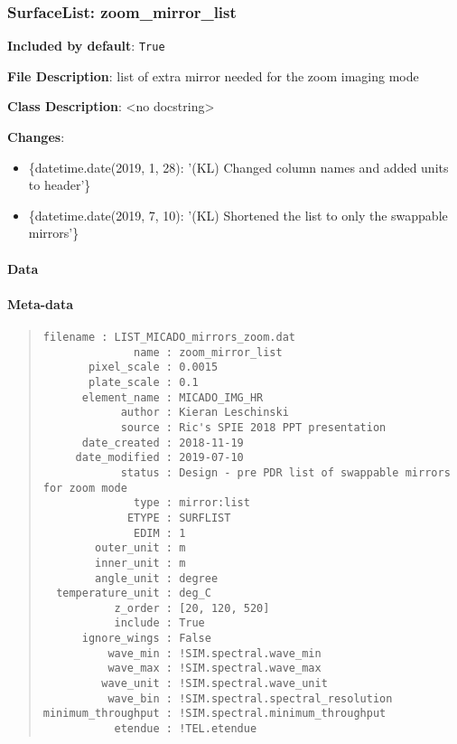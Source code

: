 \subsubsection{SurfaceList: \textquotedbl{}zoom\_mirror\_list\textquotedbl{}%
  \label{surfacelist-zoom-mirror-list}%
}

\textbf{Included by default}: \texttt{True}

\textbf{File Description}: list of extra mirror needed for the zoom imaging mode

\textbf{Class Description}: <no docstring>

\textbf{Changes}:

\begin{itemize}
\item \{datetime.date(2019, 1, 28): '(KL) Changed column names and added units to header'\}

\item \{datetime.date(2019, 7, 10): '(KL) Shortened the list to only the swappable mirrors'\}
\end{itemize}


\paragraph{Data%
  \label{data}%
}


\paragraph{Meta-data%
  \label{meta-data}%
}

\begin{quote}
\begin{alltt}
\begin{lstlisting}[frame=single]
          filename : LIST_MICADO_mirrors_zoom.dat
              name : zoom_mirror_list
       pixel_scale : 0.0015
       plate_scale : 0.1
      element_name : MICADO_IMG_HR
            author : Kieran Leschinski
            source : Ric's SPIE 2018 PPT presentation
      date_created : 2018-11-19
     date_modified : 2019-07-10
            status : Design - pre PDR list of swappable mirrors for zoom mode
              type : mirror:list
             ETYPE : SURFLIST
              EDIM : 1
        outer_unit : m
        inner_unit : m
        angle_unit : degree
  temperature_unit : deg_C
           z_order : [20, 120, 520]
           include : True
      ignore_wings : False
          wave_min : !SIM.spectral.wave_min
          wave_max : !SIM.spectral.wave_max
         wave_unit : !SIM.spectral.wave_unit
          wave_bin : !SIM.spectral.spectral_resolution
minimum_throughput : !SIM.spectral.minimum_throughput
           etendue : !TEL.etendue
\end{lstlisting}
\end{alltt}
\end{quote}


